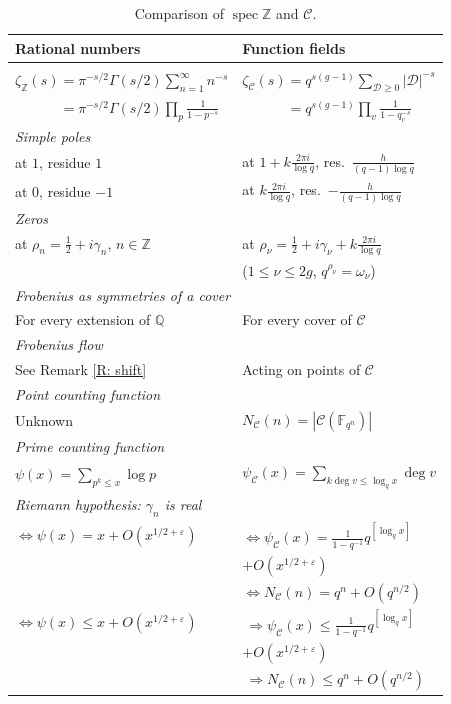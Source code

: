 \documentclass{amsart}
\newcommand\Z{\mathbb{Z}}	\newcommand\C{\mathbb{C}}
\newcommand\Q{\mathbb{Q}}	\newcommand\R{\mathbb{R}}
\newcommand\spec{\operatorname{spec}}
\newcommand\F{\mathbb{F}}
\newcommand\Curve{\mathcal{C}}
\newcommand\calD{\mathcal{D}}	\newcommand\calK{\mathcal{K}}
\theoremstyle{definition}\newtheorem{definition}[theorem]{Definition}
\theoremstyle{remark}\newtheorem{remark}[theorem]{Remark}
\numberwithin{equation}{section}
\begin{document}
\begin{table}[htb]
\caption{Comparison of $\spec\Z$ and $\Curve$.}
\label{T: comparison}
\begin{center}\medskip\begin{tabular}{ll}
Rational numbers	&Function fields\\
\hline\\[-9pt]
$\zeta_\Z(s)=\pi^{-s/2}\Gamma(s/2)\sum_{n=1}^\infty n^{-s}$
			&$\zeta_\Curve(s)=q^{s(g-1)}\sum_{\calD\geq0}|\calD|^{-s}$\\[2pt]
$\phantom{\zeta_\Z(s)}=\pi^{-s/2}\Gamma(s/2)\prod_{p}\frac1{1-p^{-s}}$
			&$\phantom{\zeta_\Curve(s)}=q^{s(g-1)}\prod_v\frac1{1-q_v^{-s}}$\\[5pt]
\em Simple poles\\
at $1$, residue $1$	&at $1+k\frac{2\pi i}{\log q}$,	res.\ $\frac h{(q-1)\log q}$\\
at $0$, residue $-1$	&at $k\frac{2\pi i}{\log q}$, res.\ $-\frac h{(q-1)\log q}$\\[5pt]
\em Zeros\\
at $\rho_n=\frac12+i\gamma_n$, $n\in\Z$
			&at $\rho_\nu=\frac12+i\gamma_\nu+k\frac{2\pi i}{\log q}$\\
			&($1\leq\nu\leq2g$, $q^{\rho_\nu}=\omega_\nu$)\\[5pt]
\multicolumn{2}{l}{\em Frobenius as symmetries of a cover}\\
For every extension of $\Q$
			&For every cover of $\Curve$\\[5pt]
\em Frobenius flow\\
See Remark \ref{R: shift}&Acting on points of $\Curve$\\[5pt]
\em Point counting function\\
Unknown			&$N_\Curve(n)=|\Curve(\F_{q^n})|$\\[5pt]
\em Prime counting function\\
$\psi(x)=\sum_{p^k\leq x}\log p$
			&$\psi_\Curve(x)=\sum_{k\deg v\leq\log_qx}\deg v$\\[5pt]
\multicolumn{2}{l}{\em Riemann hypothesis: $\gamma_n$ is real}\\
$\Longleftrightarrow\psi(x)=x+O(x^{1/2+\varepsilon})$
			&$\Longleftrightarrow\psi_\Curve(x)=\frac{1}{1-q^{-1}}q^{[\log_qx]}$\\
			&\hspace{65pt}$+O(x^{1/2+\varepsilon})$\\
			&$\Longleftrightarrow N_\Curve(n)=q^n+O(q^{n/2})$\\
$\Longleftrightarrow\psi(x)\leq x+O(x^{1/2+\varepsilon})\quad$
			&$\:\Longrightarrow\psi_\Curve(x)\leq\frac{1}{1-q^{-1}}q^{[\log_qx]}$\\
			&\hspace{65pt}$+O(x^{1/2+\varepsilon})$\\
			&$\:\Longrightarrow N_\Curve(n)\leq q^n+O(q^{n/2})$
\end{tabular}\end{center}
\end{table}
\end{document}
